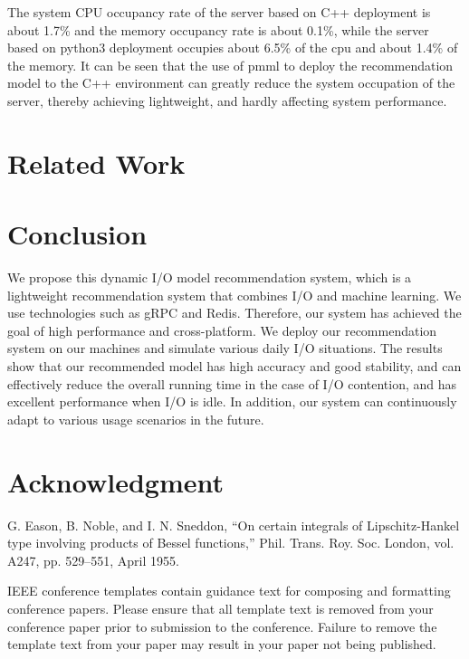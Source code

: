 \documentclass[conference]{IEEEtran}
\begin{document}
	The system CPU occupancy rate of the server based on C++ deployment is about 1.7\% and the memory occupancy rate is about 0.1\%, while the server based on python3 deployment occupies about 6.5\% of the cpu and about 1.4\% of the memory. It can be seen that the use of pmml to deploy the recommendation model to the C++ environment can greatly reduce the system occupation of the server, thereby achieving lightweight, and hardly affecting system performance.


\section{Related Work}

\section{Conclusion}
We propose this dynamic I/O model recommendation system, which is a lightweight recommendation system that combines I/O and machine learning. 
We use technologies such as gRPC and Redis. Therefore, our system has achieved the goal of high performance and cross-platform. 
We deploy our recommendation system on our machines and simulate various daily I/O situations. 
The results show that our recommended model has high accuracy and good stability, and can effectively reduce the overall running time in the case of I/O contention, and has excellent performance when I/O is idle.
In addition, our system can continuously adapt to various usage scenarios in the future.

\section*{Acknowledgment}




\begin{thebibliography}{00}
	 G. Eason, B. Noble, and I. N. Sneddon, ``On certain integrals of Lipschitz-Hankel type involving products of Bessel functions,'' Phil. Trans. Roy. Soc. London, vol. A247, pp. 529--551, April 1955.
\end{thebibliography}
\vspace{12pt}
\color{red}
IEEE conference templates contain guidance text for composing and formatting conference papers. Please ensure that all template text is removed from your conference paper prior to submission to the conference. Failure to remove the template text from your paper may result in your paper not being published.
\end{document}
